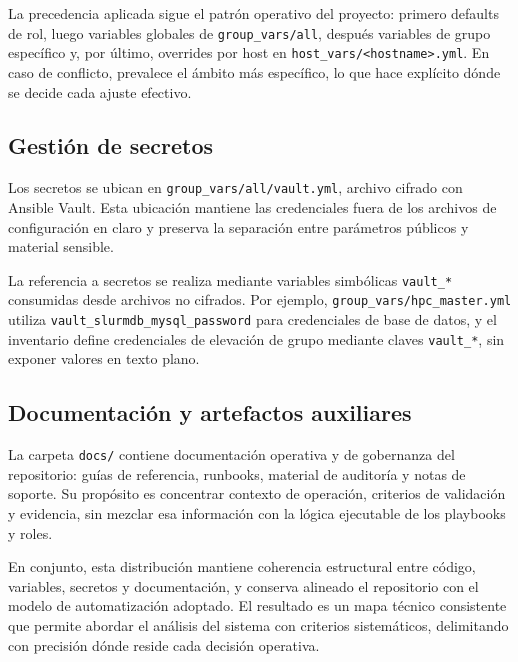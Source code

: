 La precedencia aplicada sigue el patrón operativo del proyecto: primero defaults de rol, luego variables globales de \texttt{group\_vars/all}, después variables de grupo específico y, por último, overrides por host en \texttt{host\_vars/<hostname>.yml}. En caso de conflicto, prevalece el ámbito más específico, lo que hace explícito dónde se decide cada ajuste efectivo.

\subsection{Gestión de secretos}

Los secretos se ubican en \texttt{group\_vars/all/vault.yml}, archivo cifrado con Ansible Vault. Esta ubicación mantiene las credenciales fuera de los archivos de configuración en claro y preserva la separación entre parámetros públicos y material sensible.

La referencia a secretos se realiza mediante variables simbólicas \texttt{vault\_*} consumidas desde archivos no cifrados. Por ejemplo, \texttt{group\_vars/hpc\_master.yml} utiliza \texttt{vault\_slurmdb\_mysql\_password} para credenciales de base de datos, y el inventario define credenciales de elevación de grupo mediante claves \texttt{vault\_*}, sin exponer valores en texto plano.

\subsection{Documentación y artefactos auxiliares}

La carpeta \texttt{docs/} contiene documentación operativa y de gobernanza del repositorio: guías de referencia, runbooks, material de auditoría y notas de soporte. Su propósito es concentrar contexto de operación, criterios de validación y evidencia, sin mezclar esa información con la lógica ejecutable de los playbooks y roles.

En conjunto, esta distribución mantiene coherencia estructural entre código, variables, secretos y documentación, y conserva alineado el repositorio con el modelo de automatización adoptado. El resultado es un mapa técnico consistente que permite abordar el análisis del sistema con criterios sistemáticos, delimitando con precisión dónde reside cada decisión operativa.

